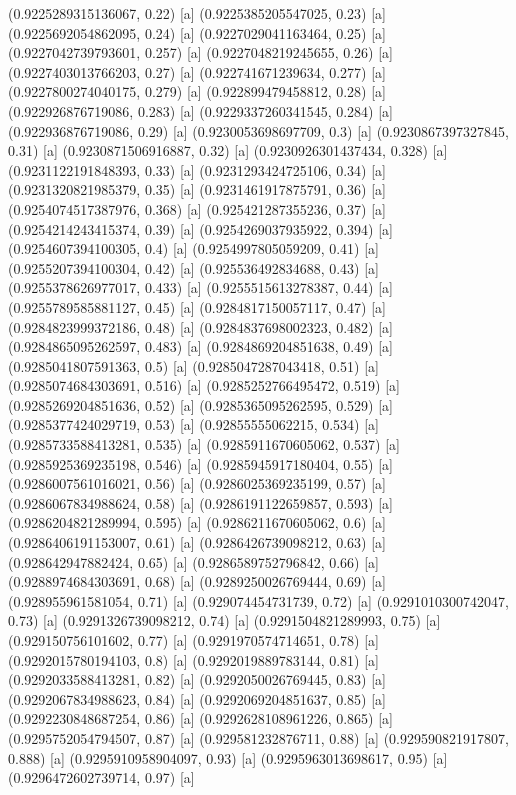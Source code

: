 {{{(0.9225289315136067, 0.22) [a] 
(0.9225385205547025, 0.23) [a] 
(0.9225692054862095, 0.24) [a] 
(0.9227029041163464, 0.25) [a] 
(0.9227042739793601, 0.257) [a] 
(0.9227048219245655, 0.26) [a] 
(0.9227403013766203, 0.27) [a] 
(0.922741671239634, 0.277) [a] 
(0.9227800274040175, 0.279) [a] 
(0.922899479458812, 0.28) [a] 
(0.922926876719086, 0.283) [a] 
(0.9229337260341545, 0.284) [a] 
(0.922936876719086, 0.29) [a] 
(0.9230053698697709, 0.3) [a] 
(0.9230867397327845, 0.31) [a] 
(0.9230871506916887, 0.32) [a] 
(0.9230926301437434, 0.328) [a] 
(0.9231122191848393, 0.33) [a] 
(0.9231293424725106, 0.34) [a] 
(0.9231320821985379, 0.35) [a] 
(0.9231461917875791, 0.36) [a] 
(0.9254074517387976, 0.368) [a] 
(0.925421287355236, 0.37) [a] 
(0.9254214243415374, 0.39) [a] 
(0.9254269037935922, 0.394) [a] 
(0.9254607394100305, 0.4) [a] 
(0.9254997805059209, 0.41) [a] 
(0.9255207394100304, 0.42) [a] 
(0.925536492834688, 0.43) [a] 
(0.9255378626977017, 0.433) [a] 
(0.9255515613278387, 0.44) [a] 
(0.9255789585881127, 0.45) [a] 
(0.9284817150057117, 0.47) [a] 
(0.9284823999372186, 0.48) [a] 
(0.9284837698002323, 0.482) [a] 
(0.9284865095262597, 0.483) [a] 
(0.9284869204851638, 0.49) [a] 
(0.9285041807591363, 0.5) [a] 
(0.9285047287043418, 0.51) [a] 
(0.9285074684303691, 0.516) [a] 
(0.9285252766495472, 0.519) [a] 
(0.9285269204851636, 0.52) [a] 
(0.9285365095262595, 0.529) [a] 
(0.9285377424029719, 0.53) [a] 
(0.92855555062215, 0.534) [a] 
(0.9285733588413281, 0.535) [a] 
(0.9285911670605062, 0.537) [a] 
(0.9285925369235198, 0.546) [a] 
(0.9285945917180404, 0.55) [a] 
(0.9286007561016021, 0.56) [a] 
(0.9286025369235199, 0.57) [a] 
(0.9286067834988624, 0.58) [a] 
(0.9286191122659857, 0.593) [a] 
(0.9286204821289994, 0.595) [a] 
(0.9286211670605062, 0.6) [a] 
(0.9286406191153007, 0.61) [a] 
(0.9286426739098212, 0.63) [a] 
(0.928642947882424, 0.65) [a] 
(0.9286589752796842, 0.66) [a] 
(0.9288974684303691, 0.68) [a] 
(0.9289250026769444, 0.69) [a] 
(0.928955961581054, 0.71) [a] 
(0.929074454731739, 0.72) [a] 
(0.9291010300742047, 0.73) [a] 
(0.9291326739098212, 0.74) [a] 
(0.9291504821289993, 0.75) [a] 
(0.929150756101602, 0.77) [a] 
(0.9291970574714651, 0.78) [a] 
(0.9292015780194103, 0.8) [a] 
(0.9292019889783144, 0.81) [a] 
(0.9292033588413281, 0.82) [a] 
(0.9292050026769445, 0.83) [a] 
(0.9292067834988623, 0.84) [a] 
(0.9292069204851637, 0.85) [a] 
(0.9292230848687254, 0.86) [a] 
(0.9292628108961226, 0.865) [a] 
(0.9295752054794507, 0.87) [a] 
(0.929581232876711, 0.88) [a] 
(0.929590821917807, 0.888) [a] 
(0.9295910958904097, 0.93) [a] 
(0.9295963013698617, 0.95) [a] 
(0.9296472602739714, 0.97) [a] 
}}}

